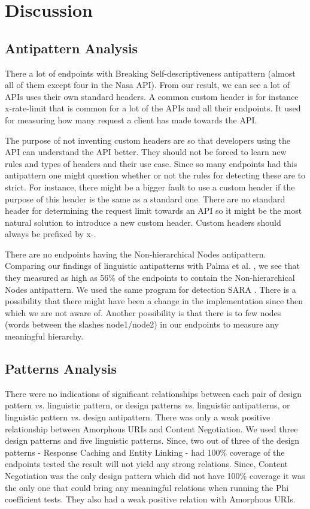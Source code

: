 \section{Discussion}

\subsection{Antipattern Analysis}

There a lot of endpoints with Breaking Self-descriptiveness antipattern (almost all of them except four in the Nasa API). From our result, we can see a lot of APIs uses their own standard headers. A common custom header is for instance x-rate-limit that is common for a lot of the APIs and all their endpoints. It used for measuring how many request a client has made towards the API. 

The purpose of not inventing custom headers are so that developers using the API can understand the API better. They should not be forced to learn new rules and types of headers and their use case. Since so many endpoints had this antipattern one might question whether or not the rules for detecting these are to strict. For instance, there might be a bigger fault to use a custom header if the purpose of this header is the same as a standard one. There are no standard header for determining the request limit towards an API so it might be the most natural solution to introduce a new custom header. Custom headers should always be prefixed by x-. 

There are no endpoints having the Non-hierarchical Nodes antipattern. Comparing our findings of linguistic antipatterns with Palma et al. \cite{linguistic}, we see that they measured as high as 56\% of the endpoints to contain the Non-hierarchical Nodes antipattern. We used the same program for detection SARA \cite{linguistic}. There is a possibility that there might have been a change in the implementation since then which we are not aware of. Another possibility is that there is to few nodes (words between the slashes node1/node2) in our endpoints to measure any meaningful hierarchy.

\subsection{Patterns Analysis}

There were no indications of significant relationships between each pair of design pattern \textit{vs.} linguistic pattern, or design patterns \textit{vs.} linguistic antipatterns, or linguistic pattern \textit{vs.} design antipattern. There was only a weak positive relationship between Amorphous URIs and Content Negotiation. We used three design patterns and five linguistic patterns. Since, two out of three of the design patterns - Response Caching and Entity Linking - had 100\% coverage of the endpoints tested the result will not yield any strong relations. Since, Content Negotiation was the only design pattern which did not have 100\% coverage it was the only one that could bring any meaningful relations when running the Phi coefficient tests. They also had a weak positive relation with Amorphous URIs.

